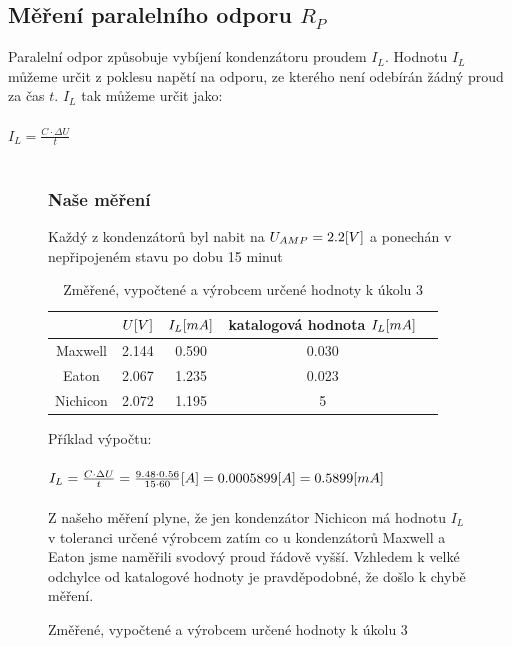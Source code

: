 \documentclass{article}
\begin{document}
\subsection*{Měření paralelního odporu \(R_P\)}
Paralelní odpor způsobuje vybíjení kondenzátoru proudem \(I_L\).
Hodnotu \(I_L\) můžeme určit z poklesu napětí na odporu, ze kterého není odebírán žádný proud za čas \(t\).
\(I_L\) tak můžeme určit jako:
\\ \\
\Large
\(
  I_L = \frac{C\cdot \Delta U}{t}
\)
\normalsize
\\ \\

\begin{figure}[H]
  \begin{minipage}[t]{\textwidth}
    \subsubsection*{Naše měření}
    Každý z kondenzátorů byl nabit na \(U_{AMP} = 2.2\-[V]\) a ponechán v nepřipojeném stavu po dobu 15 minut
    \begin{table}[H]
      \centering
      \begin{tabular}{|c|c|c||c|c|}
      \hline
                  &	\(U\-[V]\) & \(I_L \-[mA]\) & katalogová hodnota \(I_L\-[mA]\)  \\ \hline
        Maxwell   & 2.144      & 0.590          & 0.030                             \\ \hline
        Eaton     & 2.067      & 1.235          & 0.023                             \\ \hline
        Nichicon  & 2.072      & 1.195          & 5                                 \\ \hline
      \end{tabular}
      \caption{\label{U_AMP} Změřené, vypočtené a výrobcem určené hodnoty k úkolu 3}
    \end{table}
    Příklad výpočtu:
    \\ \\
    \Large
    \(
      I_L = \frac{C\cdot \Delta U}{t} = \frac{9.48\cdot 0.56}{15\cdot 60}\-[A]=0.0005899\-[A] = 0.5899\-[mA]
    \)
    \normalsize
    \\ \\
    Z našeho měření plyne, že jen kondenzátor Nichicon má hodnotu \(I_L\) v toleranci určené výrobcem zatím co u kondenzátorů Maxwell a Eaton jsme naměřili svodový proud řádově vyšší.
    Vzhledem k velké odchylce od katalogové hodnoty je pravděpodobné, že došlo k chybě měření.  
  \end{minipage}
\end{figure}
\end{document}
